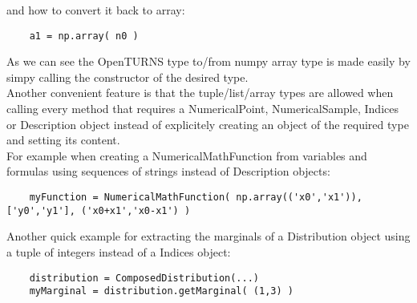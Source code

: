 and how to convert it back to array:
\begin{center}
  \begin{lstlisting}
    a1 = np.array( n0 )
  \end{lstlisting}
\end{center}

As we can see the OpenTURNS type to/from numpy array type is made easily by simpy calling the constructor of the desired type.\\
Another convenient feature is that the tuple/list/array types are allowed when calling every method that requires a NumericalPoint, NumericalSample, Indices or Description object
instead of explicitely creating an object of the required type and setting its content.\\

For example when creating a NumericalMathFunction from variables and formulas using sequences of strings instead of Description objects:
\begin{center}
  \begin{lstlisting}
    myFunction = NumericalMathFunction( np.array(('x0','x1')), ['y0','y1'], ('x0+x1','x0-x1') )
  \end{lstlisting}
\end{center}

Another quick example for extracting the marginals of a Distribution object using a tuple of integers instead of a Indices object:
\begin{center}
  \begin{lstlisting}
    distribution = ComposedDistribution(...)
    myMarginal = distribution.getMarginal( (1,3) )
  \end{lstlisting}
\end{center}
